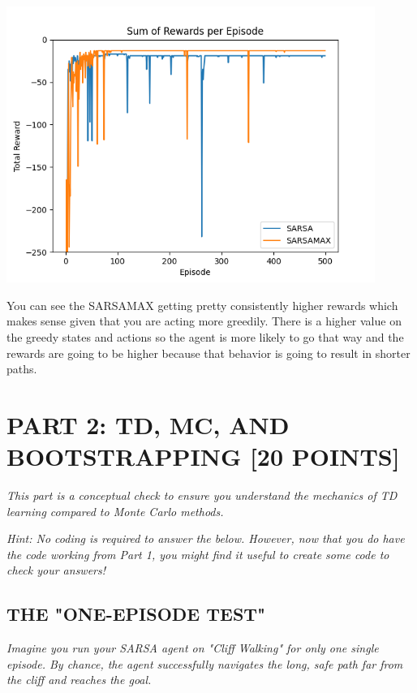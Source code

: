 \documentclass{article}
\begin{document}
\begin{itemize}
    \includegraphics[width=0.9\textwidth]{rewardsComparison.png}
    
    You can see the SARSAMAX getting pretty consistently higher rewards which makes sense given that you are acting more greedily. There is a higher value on the greedy states and actions so the agent is more likely to go that way and the rewards are going to be higher because that behavior is going to result in shorter paths.
\end{itemize}

\section{PART 2: TD, MC, AND BOOTSTRAPPING [20 POINTS]}

\textit{This part is a conceptual check to ensure you understand the mechanics of TD learning compared to Monte Carlo methods.}

\textit{Hint: No coding is required to answer the below. However, now that you do have the code working from Part 1, you might find it useful to create some code to check your answers!}

\subsection{THE "ONE-EPISODE TEST"}

\textit{Imagine you run your SARSA agent on "Cliff Walking" for only one single episode. By chance, the agent successfully navigates the long, safe path far from the cliff and reaches the goal.}
\end{document}
